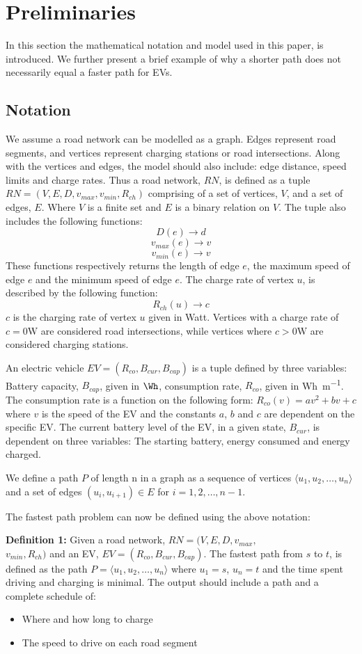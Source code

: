 \section{Preliminaries} \label{sec:notation}
In this section the mathematical notation and model used in this paper, is introduced. We further present a brief example of why a shorter path does not necessarily equal a faster path for EVs. 

\subsection{Notation}
We assume a road network can be modelled as a graph. Edges represent road segments, and vertices represent charging stations or road intersections. Along with the vertices and edges, the model should also include: edge distance, speed limits and charge rates. Thus a road network, $RN$, is defined as a tuple $RN=(V,E,D,v_{max},v_{min},R_{ch})$ comprising of a set of vertices, $V$, and a set of edges, $E$. Where $V$ is a finite set and $E$ is a binary relation on $V$. The tuple also includes the following functions:
\[ D(e)\rightarrow d \] 
\[ v_{max}(e)\rightarrow v \]
\[ v_{min}(e)\rightarrow v \]
These functions respectively returns the length of edge $e$, the maximum speed of edge $e$ and the minimum speed of edge $e$. The charge rate of vertex $u$, is described by the following function:
\[R_{ch}(u)\rightarrow c\]
$c$ is the charging rate of vertex $u$ given in Watt. Vertices with a charge rate of $c = 0\si{\W}$ are considered road intersections, while vertices where $c > 0\si{\W}$ are considered charging stations. 

An electric vehicle $EV=(R_{co},B_{cur},B_{cap})$ is a tuple defined by three variables: Battery capacity, $B_{cap}$, given in $\si{\Wh}$, consumption rate, $R_{co}$, given in \si{Wh\per m}. The consumption rate is a function on the following form:
\( R_{co}(v)=av^2+bv+c \)
where $v$ is the speed of the EV and the constants $a$, $b$ and $c$ are dependent on the specific EV. The current battery level of the EV, in a given state, $B_{cur}$, is dependent on three variables: The starting battery, energy consumed and energy charged.

We define a path $P$ of length n in a graph as a sequence of vertices $\langle u_1,u_2,\dots,u_n \rangle$ and a set of edges $(u_{i},u_{i+1})\in E$ for $i=1,2,\dots,n-1$.

The fastest path problem can now be defined using the above notation:

\textbf{Definition 1:} Given a road network, $RN=(V,E,D,v_{max},$\\ 
$v_{min},R_{ch})$ and an EV, $EV=(R_{co},B_{cur},B_{cap})$. The fastest path 
from $s$ to $t$, is defined as the path $P = \langle u_1,u_2,\dots,u_n \rangle$ where $u_1 = s$, $u_n = t$ and the time spent driving and charging is minimal. The output should include a path and a complete schedule of:
\begin{itemize}
\item Where and how long to charge
\item The speed to drive on each road segment
\end{itemize}



